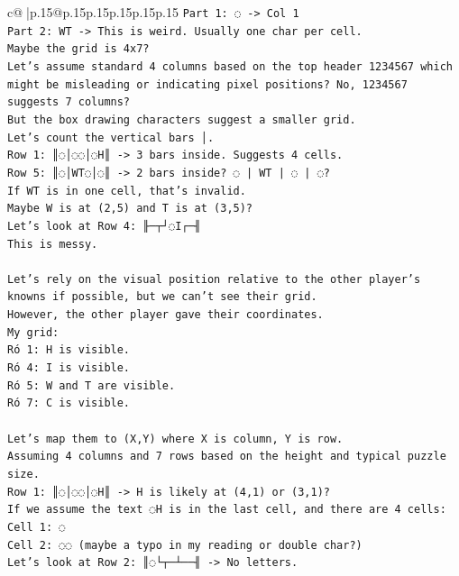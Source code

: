 \documentclass{article}
\begin{document}
{\begin{supertabular}{c@{$\;$}|p{.15\linewidth}@{}p{.15\linewidth}p{.15\linewidth}p{.15\linewidth}p{.15\linewidth}p{.15\linewidth}}
{{{\texttt{Part 1: ◌ {-}> Col 1} \\
\texttt{Part 2: WT {-}> This is weird. Usually one char per cell.} \\
\texttt{Maybe the grid is 4x7?} \\
\texttt{Let's assume standard 4 columns based on the top header 1234567 which might be misleading or indicating pixel positions? No, 1234567 suggests 7 columns?} \\
\texttt{But the box drawing characters suggest a smaller grid.} \\
\texttt{Let's count the vertical bars │.} \\
\texttt{Row 1: ║◌│◌◌│◌H║ {-}> 3 bars inside. Suggests 4 cells.} \\
\texttt{Row 5: ║◌│WT◌│◌║ {-}> 2 bars inside? ◌ | WT | ◌ | ◌?} \\
\texttt{If WT is in one cell, that's invalid.} \\
\texttt{Maybe W is at (2,5) and T is at (3,5)?} \\
\texttt{Let's look at Row 4: ╟─┬┘◌I┌─╢} \\
\texttt{This is messy.} \\
\\ 
\texttt{Let's rely on the visual position relative to the other player's knowns if possible, but we can't see their grid.} \\
\texttt{However, the other player gave their coordinates.} \\
\texttt{My grid:} \\
\texttt{Ró 1: H is visible.} \\
\texttt{Ró 4: I is visible.} \\
\texttt{Ró 5: W and T are visible.} \\
\texttt{Ró 7: C is visible.} \\
\\ 
\texttt{Let's map them to (X,Y) where X is column, Y is row.} \\
\texttt{Assuming 4 columns and 7 rows based on the height and typical puzzle size.} \\
\texttt{Row 1: ║◌│◌◌│◌H║ {-}> H is likely at (4,1) or (3,1)?} \\
\texttt{If we assume the text ◌H is in the last cell, and there are 4 cells:} \\
\texttt{Cell 1: ◌} \\
\texttt{Cell 2: ◌◌ (maybe a typo in my reading or double char?)} \\
\texttt{Let's look at Row 2: ║◌└┬─┴──╢ {-}> No letters.} \\
}}}
\end{supertabular}}
\end{document}

